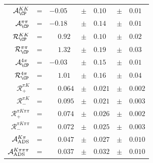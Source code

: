 \begin{center}
\begin{tabular}{rclclcl}
$\mathcal{A}_{\CP}^{KK}$ &= & $-0.05$ & $\pm$ & $0.10$ & $\pm$ & $0.01$ \\
$\mathcal{A}_{\CP}^{\pi\pi}$ &= & $-0.18$ & $\pm$ & $0.14$ & $\pm$ & $0.01$ \\
$\mathcal{R}_{\CP}^{KK}$ &= & $\phantom{+}0.92$ & $\pm$ & $0.10$ & $\pm$ & $0.02$ \\
$\mathcal{R}_{\CP}^{\pi\pi}$ &= & $\phantom{+}1.32$ & $\pm$ & $0.19$ & $\pm$ & $0.03$ \\
$\mathcal{A}_{\CP}^{4\pi}$ &= & $-0.03$ & $\pm$ & $0.15$ & $\pm$ & $0.01$ \\
$\mathcal{R}_{\CP}^{4\pi}$ &= & $\phantom{+}1.01$ & $\pm$ & $0.16$ & $\pm$ & $0.04$ \\
$\mathcal{R}_+^{\pi K}$ &= & $\phantom{+}0.064$ & $\pm$ & $0.021$ & $\pm$ & $0.002$ \\
$\mathcal{R}_-^{\pi K}$ &= & $\phantom{+}0.095$ & $\pm$ & $0.021$ & $\pm$ & $0.003$ \\
$\mathcal{R}_+^{\pi K\pi\pi}$ &= & $\phantom{+}0.074$ & $\pm$ & $0.026$ & $\pm$ & $0.002$ \\
$\mathcal{R}_-^{\pi K\pi\pi}$ &= & $\phantom{+}0.072$ & $\pm$ & $0.025$ & $\pm$ & $0.003$ \\
$\mathcal{A}_{\rm ADS}^{K\pi}$ &= & $\phantom{+}0.047$ & $\pm$ & $0.027$ & $\pm$ & $0.010$ \\
$\mathcal{A}_{\rm ADS}^{K\pi\pi\pi}$ &= & $\phantom{+}0.037$ & $\pm$ & $0.032$ & $\pm$ & $0.010$ \\
\end{tabular}
\end{center}
